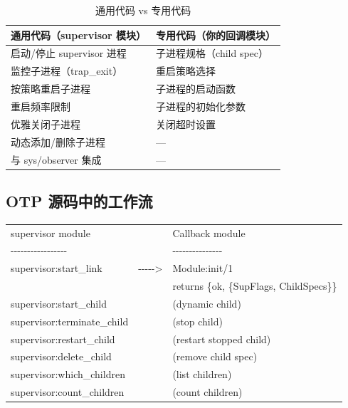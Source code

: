 \documentclass[a4paper,11pt]{article}
\begin{document}
\begin{table}[H]
\centering
\begin{tabular}{@{}ll@{}}
\toprule
\textbf{通用代码（supervisor 模块）} & \textbf{专用代码（你的回调模块）} \\
\midrule
启动/停止 supervisor 进程 & 子进程规格（child spec） \\
监控子进程（trap\_exit） & 重启策略选择 \\
按策略重启子进程 & 子进程的启动函数 \\
重启频率限制 & 子进程的初始化参数 \\
优雅关闭子进程 & 关闭超时设置 \\
动态添加/删除子进程 & --- \\
与 sys/observer 集成 & --- \\
\bottomrule
\end{tabular}
\caption{通用代码 vs 专用代码}
\end{table}

\subsection{OTP 源码中的工作流}

\begin{tcolorbox}[colback=codebg, colframe=codeborder, arc=2mm, boxrule=0.5pt,
                  title={\textbf{supervisor.erl --- Work Flow}},
                  fonttitle=\bfseries\ttfamily, width=\textwidth]
\small\ttfamily
\begin{tabular}{@{}lcl@{}}
supervisor module &  & Callback module \\
\textsf{-{}-{}-{}-{}-{}-{}-{}-{}-{}-{}-{}-{}-{}-{}-{}-{}-} & & \textsf{-{}-{}-{}-{}-{}-{}-{}-{}-{}-{}-{}-{}-{}-{}-} \\
supervisor:start\_link & -{}-{}-{}-{}-> & Module:init/1 \\
 & & \quad returns \{ok, \{SupFlags, ChildSpecs\}\} \\
supervisor:start\_child & & (dynamic child) \\
supervisor:terminate\_child & & (stop child) \\
supervisor:restart\_child & & (restart stopped child) \\
supervisor:delete\_child & & (remove child spec) \\
supervisor:which\_children & & (list children) \\
supervisor:count\_children & & (count children) \\
\end{tabular}
\end{tcolorbox}
\end{document}
